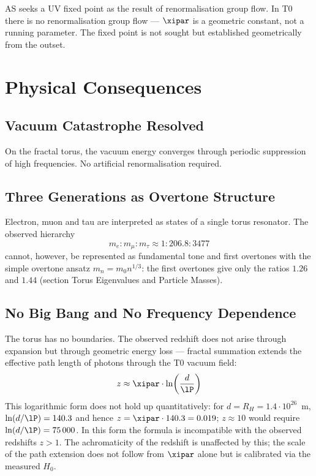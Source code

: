 AS seeks a UV fixed point as the result of renormalisation group flow. In T0 there is no renormalisation group flow — $\xipar$ is a geometric constant, not a running parameter. The fixed point is not sought but established geometrically from the outset.

\section{Physical Consequences}

\subsection{Vacuum Catastrophe Resolved}

On the fractal torus, the vacuum energy converges through periodic suppression of high frequencies. No artificial renormalisation required.

\subsection{Three Generations as Overtone Structure}

Electron, muon and tau are interpreted as states of a single torus resonator. The observed hierarchy
\begin{equation}
	m_e : m_\mu : m_\tau \approx 1 : 206{.}8 : 3477
\end{equation}
cannot, however, be represented as fundamental tone and first overtones with the simple overtone ansatz $m_n = m_0 n^{1/3}$: the first overtones give only the ratios $1.26$ and $1.44$ (section Torus Eigenvalues and Particle Masses).

\subsection{No Big Bang and No Frequency Dependence}

The torus has no boundaries. The observed redshift does not arise through expansion but through geometric energy loss — fractal summation extends the effective path length of photons through the T0 vacuum field:
\begin{equation}
	z \approx \xipar \cdot \ln\!\left(\frac{d}{\lP}\right)
\end{equation}
This logarithmic form does not hold up quantitatively: for $d = R_H = 1.4\cdot 10^{26}$~m, $\ln(d/\lP) = 140.3$ and hence $z = \xipar \cdot 140.3 = 0.019$; $z \approx 10$ would require $\ln(d/\lP) = 75\,000$. In this form the formula is incompatible with the observed redshifts $z > 1$. The achromaticity of the redshift is unaffected by this; the scale of the path extension does not follow from $\xipar$ alone but is calibrated via the measured $H_0$.


